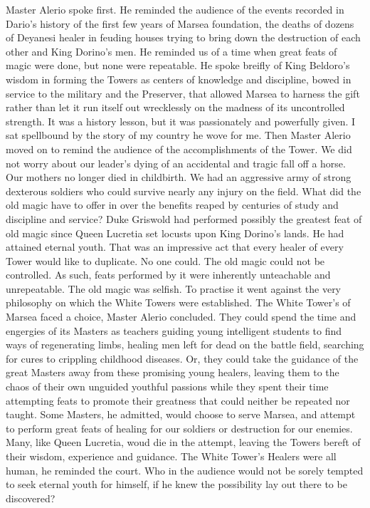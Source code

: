 \documentclass{article}
\begin{document}
Master Alerio spoke first. He reminded the audience of the events recorded in Dario's history of the first few years of Marsea foundation, the deaths of dozens of Deyanesi healer in feuding houses trying to bring down the destruction of each other and King Dorino's men. He reminded us of a time when great feats of magic were done, but none were repeatable. He spoke breifly of King Beldoro's wisdom in forming the Towers as centers of knowledge and discipline, bowed in service to the military and the Preserver, that allowed Marsea to harness the gift rather than let it run itself out wrecklessly on the madness of its uncontrolled strength. It was a history lesson, but it was passionately and powerfully given. I sat spellbound by the story of my country he wove for me. Then Master Alerio moved on to remind the audience of the accomplishments of the Tower. We did not worry about our leader's dying of an accidental and tragic fall off a horse. Our mothers no longer died in childbirth. We had an aggressive army of strong dexterous soldiers who could survive nearly any injury on the field. What did the old magic have to offer in over the benefits reaped by centuries of study and discipline and service? Duke Griswold had performed possibly the greatest feat of old magic since Queen Lucretia set locusts upon King Dorino's lands. He had attained eternal youth. That was an impressive act that every healer of every Tower would like to duplicate. No one could. The old magic could not be controlled. As such, feats performed by it were inherently unteachable and unrepeatable. The old magic was selfish. To practise it went against the very philosophy on which the White Towers were established. The White Tower's of Marsea faced a choice, Master Alerio concluded. They could spend the time and engergies of its Masters as teachers guiding young intelligent students to find ways of regenerating limbs, healing men left for dead on the battle field, searching for cures to crippling childhood diseases. Or, they could take the guidance of the great Masters away from these promising young healers, leaving them to the chaos of their own unguided youthful passions while they spent their time attempting feats to promote their greatness that could neither be repeated nor taught. Some Masters, he admitted, would choose to serve Marsea, and attempt to perform great feats of healing for our soldiers or destruction for our enemies. Many, like Queen Lucretia, woud die in the attempt, leaving the Towers bereft of their wisdom, experience and guidance. The White Tower's Healers were all human, he reminded the court. Who in the audience would not be sorely tempted to seek eternal youth for himself, if he knew the possibility lay out there to be discovered?
\end{document}
